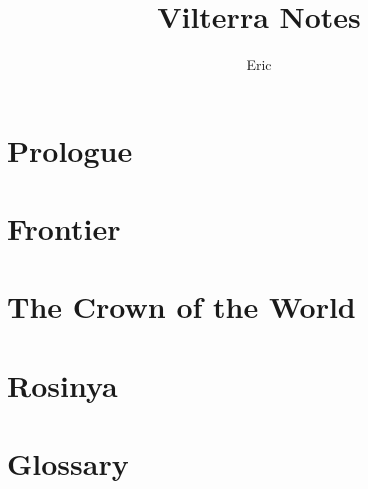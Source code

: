 \documentclass[10pt,twoside,twocolumn,openany,nodeprecatedcode]{dndbook}
\title{Vilterra Notes}
\author{Eric}
\begin{document}
\maketitle

\setcounter{chapter}{-1}
\chapter{Prologue}%
\label{cha:Vilterra}


\chapter{Frontier}%
\label{cha:Frontier}



\chapter{The Crown of the World}%
\label{cha:The Crown of the World}



\chapter{Rosinya}%
\label{cha:Rosinya}



\chapter{Glossary}%
\label{cha:Glossary}


\end{document}

